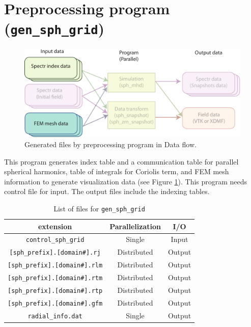 \section{Preprocessing program ({\tt gen\_sph\_grid})}
\label{section:gen_sph_grid}
%
\begin{figure}[htbp]
\begin{center}
\includegraphics*[width=130mm]{images/flow_1}
\end{center}
\caption{Generated files by preprocessing program in Data flow.}
\label{fig:gen_sph_grid}
\end{figure}
%
This program generates index table and a communication table for parallel spherical harmonics, table of integrals for Coriolis term, and FEM mesh information to generate visualization data (see Figure \ref{fig:gen_sph_grid}). This program needs control file for input. The output files include the indexing tables. 

%
\begin{table}[htdp]
\caption{List of files for {\tt gen\_sph\_grid} }
\begin{center} 
\begin{tabular}{|c|c|c|}
\hline
 extension & Parallelization & I/O \\ \hline \hline
\verb|control_sph_grid| & Single & Input \\ \hline
\verb|[sph_prefix].[domain#].rj|  & Distributed & Output \\
\verb|[sph_prefix].[domain#].rlm| & Distributed & Output \\
\verb|[sph_prefix].[domain#].rtm| & Distributed & Output \\
\verb|[sph_prefix].[domain#].rtp| & Distributed & Output \\ \hline
\verb|[sph_prefix].[domain#].gfm| & Distributed & Output \\
\verb|radial_info.dat| & Single & Output \\ \hline
\end{tabular}
\end{center}
\label{table:gen_sph_grid}
\end{table}
%

